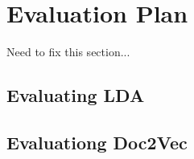 
\section{Evaluation Plan}
Need to fix this section...

\subsection{Evaluating LDA}

\subsection{Evaluationg Doc2Vec}

